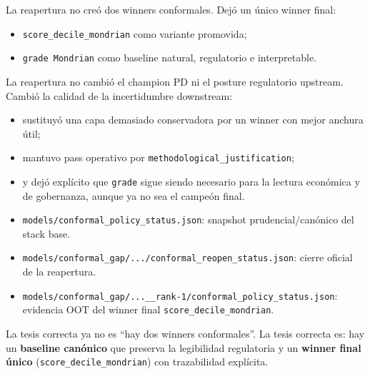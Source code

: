 \documentclass[
  spanish,
  11pt,
  letterpaper,
]{scrbook}
\providecommand{\tightlist}{%
  \setlength{\itemsep}{0pt}\setlength{\parskip}{0pt}}
\theoremstyle{plain}
\theoremstyle{remark}
\begin{document}
La reapertura no creó dos winners conformales. Dejó un único winner
final:

\begin{itemize}
\tightlist
\item
  \texttt{score\_decile\_mondrian} como variante promovida;
\item
  \texttt{grade\ Mondrian} como baseline natural, regulatorio e
  interpretable.
\end{itemize}

La reapertura no cambió el champion PD ni el posture regulatorio
upstream. Cambió la calidad de la incertidumbre downstream:

\begin{itemize}
\tightlist
\item
  sustituyó una capa demasiado conservadora por un winner con mejor
  anchura útil;
\item
  mantuvo pass operativo por \texttt{methodological\_justification};
\item
  y dejó explícito que \texttt{grade} sigue siendo necesario para la
  lectura económica y de gobernanza, aunque ya no sea el campeón final.
\end{itemize}

\begin{tcolorbox}[enhanced jigsaw, arc=.35mm, bottomrule=.15mm, bottomtitle=1mm, breakable, colback=white, colbacktitle=quarto-callout-note-color!10!white, colframe=quarto-callout-note-color-frame, coltitle=black, left=2mm, leftrule=.75mm, opacityback=0, opacitybacktitle=0.6, rightrule=.15mm, title=\textcolor{quarto-callout-note-color}{\faInfo}\hspace{0.5em}{Cómo leer los artefactos conformales finales}, titlerule=0mm, toprule=.15mm, toptitle=1mm]

\begin{itemize}
\tightlist
\item
  \texttt{models/conformal\_policy\_status.json}: snapshot
  prudencial/canónico del stack base.
\item
  \texttt{models/conformal\_gap/.../conformal\_reopen\_status.json}:
  cierre oficial de la reapertura.
\item
  \texttt{models/conformal\_gap/...\_\_rank-1/conformal\_policy\_status.json}:
  evidencia OOT del winner final \texttt{score\_decile\_mondrian}.
\end{itemize}

La tesis correcta ya no es ``hay dos winners conformales''. La tesis
correcta es: hay un \textbf{baseline canónico} que preserva la
legibilidad regulatoria y un \textbf{winner final único}
(\texttt{score\_decile\_mondrian}) con trazabilidad explícita.

\end{tcolorbox}
\end{document}
